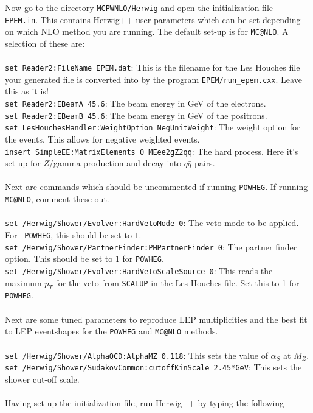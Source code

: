 \documentclass[12pt,a4paper,oneside]{article}
\begin{document}
Now go to the directory {\tt MCPWNLO/Herwig} and open the initialization file {\tt
  EPEM.in}. This contains \textsf{Herwig++} user parameters which can be set depending on
which NLO method you are running. The default set-up is for {\tt MC@NLO}. A selection of
these are:\\
\\
{\tt set Reader2:FileName EPEM.dat}: This is the filename for the Les Houches file your
generated file is converted into by the program {\tt EPEM/run\_epem.cxx}. Leave this
as it is! \\
{\tt set Reader2:EBeamA 45.6}: The beam energy in GeV of the electrons. \\
{\tt set Reader2:EBeamB 45.6}: The beam energy in GeV of the positrons.\\
{\tt set LesHouchesHandler:WeightOption NegUnitWeight}: The weight option for the
events. This allows for negative weighted events. \\
{\tt insert SimpleEE:MatrixElements 0 MEee2gZ2qq}: The hard process. Here it's set up for
$Z$/gamma production and decay into $q \bar{q}$ pairs.\\
\\
Next are commands which should be uncommented if running {\tt POWHEG}. If running {\tt MC@NLO}, comment these out. \\
\\
{\tt set /Herwig/Shower/Evolver:HardVetoMode 0}: The veto mode to be applied. For {\tt
  POWHEG}, this should be set to $1$.\\
{\tt set /Herwig/Shower/PartnerFinder:PHPartnerFinder 0}: The partner finder option. This
should be set to $1$ for {\tt POWHEG}.\\
{\tt set /Herwig/Shower/Evolver:HardVetoScaleSource 0}: This reads the maximum $p_T$ for
the veto from {\tt SCALUP} in the Les Houches file. Set this to 1 for {\tt POWHEG}. \\
\\
Next are some tuned parameters to reproduce LEP multiplicities and the best fit to LEP
eventshapes for the {\tt POWHEG} and {\tt MC@NLO} methods.\\
\\
{\tt set /Herwig/Shower/AlphaQCD:AlphaMZ 0.118}: This sets the value of $\alpha_S$ at $M_Z$.\\
{ \tt set /Herwig/Shower/SudakovCommon:cutoffKinScale 2.45*GeV}: This sets the shower
cut-off scale.\\
\\
Having set up the initialization file, run \textsf{Herwig++} by typing the following
\end{document}
